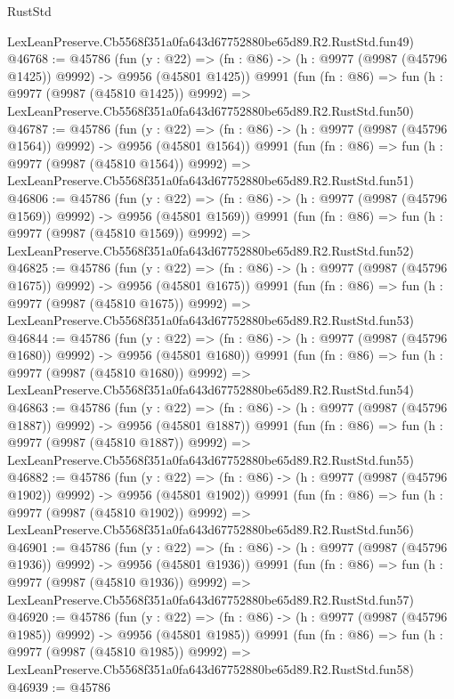 \begin{lexlean}{RustStd}
\begin{coremodule}
    LexLeanPreserve.Cb5568f351a0fa643d67752880be65d89.R2.RustStd.fun49)
@46768 := @45786
    (fun (y : @22) =>
    (fn : @86) -> (h : @9977 (@9987 (@45796 @1425)) @9992) -> @9956 (@45801 @1425))
    @9991
    (fun (fn : @86) =>
    fun (h : @9977 (@9987 (@45810 @1425)) @9992) =>
    LexLeanPreserve.Cb5568f351a0fa643d67752880be65d89.R2.RustStd.fun50)
@46787 := @45786
    (fun (y : @22) =>
    (fn : @86) -> (h : @9977 (@9987 (@45796 @1564)) @9992) -> @9956 (@45801 @1564))
    @9991
    (fun (fn : @86) =>
    fun (h : @9977 (@9987 (@45810 @1564)) @9992) =>
    LexLeanPreserve.Cb5568f351a0fa643d67752880be65d89.R2.RustStd.fun51)
@46806 := @45786
    (fun (y : @22) =>
    (fn : @86) -> (h : @9977 (@9987 (@45796 @1569)) @9992) -> @9956 (@45801 @1569))
    @9991
    (fun (fn : @86) =>
    fun (h : @9977 (@9987 (@45810 @1569)) @9992) =>
    LexLeanPreserve.Cb5568f351a0fa643d67752880be65d89.R2.RustStd.fun52)
@46825 := @45786
    (fun (y : @22) =>
    (fn : @86) -> (h : @9977 (@9987 (@45796 @1675)) @9992) -> @9956 (@45801 @1675))
    @9991
    (fun (fn : @86) =>
    fun (h : @9977 (@9987 (@45810 @1675)) @9992) =>
    LexLeanPreserve.Cb5568f351a0fa643d67752880be65d89.R2.RustStd.fun53)
@46844 := @45786
    (fun (y : @22) =>
    (fn : @86) -> (h : @9977 (@9987 (@45796 @1680)) @9992) -> @9956 (@45801 @1680))
    @9991
    (fun (fn : @86) =>
    fun (h : @9977 (@9987 (@45810 @1680)) @9992) =>
    LexLeanPreserve.Cb5568f351a0fa643d67752880be65d89.R2.RustStd.fun54)
@46863 := @45786
    (fun (y : @22) =>
    (fn : @86) -> (h : @9977 (@9987 (@45796 @1887)) @9992) -> @9956 (@45801 @1887))
    @9991
    (fun (fn : @86) =>
    fun (h : @9977 (@9987 (@45810 @1887)) @9992) =>
    LexLeanPreserve.Cb5568f351a0fa643d67752880be65d89.R2.RustStd.fun55)
@46882 := @45786
    (fun (y : @22) =>
    (fn : @86) -> (h : @9977 (@9987 (@45796 @1902)) @9992) -> @9956 (@45801 @1902))
    @9991
    (fun (fn : @86) =>
    fun (h : @9977 (@9987 (@45810 @1902)) @9992) =>
    LexLeanPreserve.Cb5568f351a0fa643d67752880be65d89.R2.RustStd.fun56)
@46901 := @45786
    (fun (y : @22) =>
    (fn : @86) -> (h : @9977 (@9987 (@45796 @1936)) @9992) -> @9956 (@45801 @1936))
    @9991
    (fun (fn : @86) =>
    fun (h : @9977 (@9987 (@45810 @1936)) @9992) =>
    LexLeanPreserve.Cb5568f351a0fa643d67752880be65d89.R2.RustStd.fun57)
@46920 := @45786
    (fun (y : @22) =>
    (fn : @86) -> (h : @9977 (@9987 (@45796 @1985)) @9992) -> @9956 (@45801 @1985))
    @9991
    (fun (fn : @86) =>
    fun (h : @9977 (@9987 (@45810 @1985)) @9992) =>
    LexLeanPreserve.Cb5568f351a0fa643d67752880be65d89.R2.RustStd.fun58)
@46939 := @45786

\end{coremodule}
\end{lexlean}
